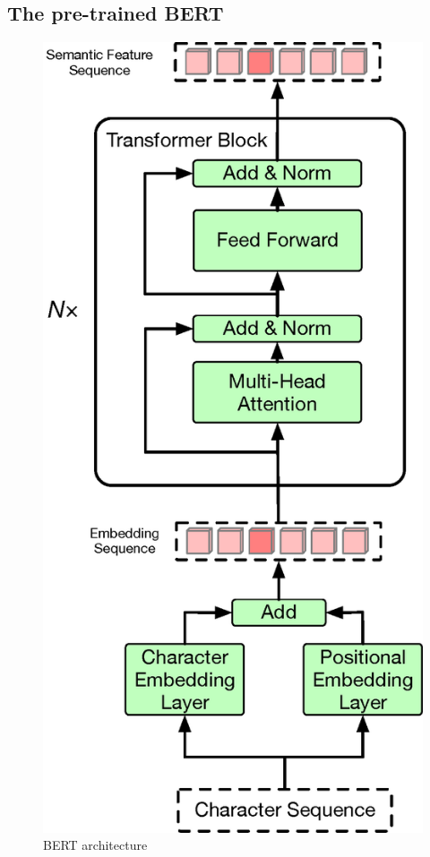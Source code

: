\documentclass[a4paper]{article}
\begin{document}
\subsection{The pre-trained BERT}

\begin{figure}[t]
	\centering
	\includegraphics[scale=0.35]{pics3/bert2.eps}
	\caption{BERT architecture}
	\label{fig:bert}
\end{figure}
\end{document}
